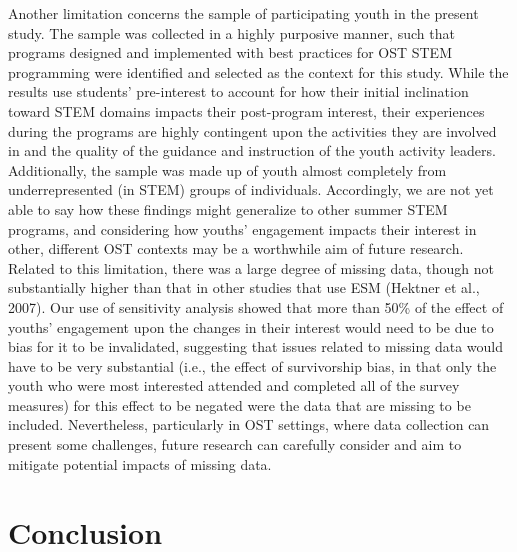 \documentclass[man]{apa6}
\theoremstyle{definition}
\theoremstyle{definition}
\theoremstyle{definition}
\theoremstyle{remark}
\begin{document}
Another limitation concerns the sample of participating youth in the
present study. The sample was collected in a highly purposive manner,
such that programs designed and implemented with best practices for OST
STEM programming were identified and selected as the context for this
study. While the results use students' pre-interest to account for how
their initial inclination toward STEM domains impacts their post-program
interest, their experiences during the programs are highly contingent
upon the activities they are involved in and the quality of the guidance
and instruction of the youth activity leaders. Additionally, the sample
was made up of youth almost completely from underrepresented (in STEM)
groups of individuals. Accordingly, we are not yet able to say how these
findings might generalize to other summer STEM programs, and considering
how youths' engagement impacts their interest in other, different OST
contexts may be a worthwhile aim of future research. Related to this
limitation, there was a large degree of missing data, though not
substantially higher than that in other studies that use ESM (Hektner et
al., 2007). Our use of sensitivity analysis showed that more than 50\%
of the effect of youths' engagement upon the changes in their interest
would need to be due to bias for it to be invalidated, suggesting that
issues related to missing data would have to be very substantial (i.e.,
the effect of survivorship bias, in that only the youth who were most
interested attended and completed all of the survey measures) for this
effect to be negated were the data that are missing to be included.
Nevertheless, particularly in OST settings, where data collection can
present some challenges, future research can carefully consider and aim
to mitigate potential impacts of missing data.

\section{Conclusion}\label{conclusion}
\end{document}
